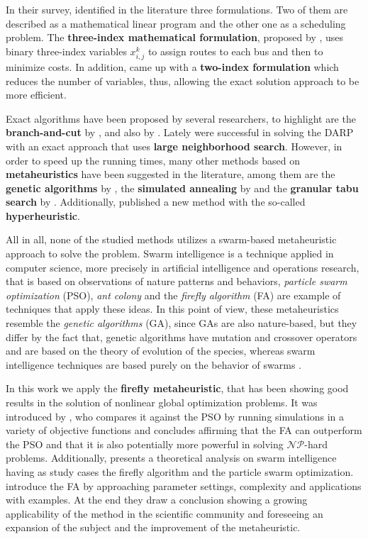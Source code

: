 \documentclass[tuberlin,cic,tc,openright,english,noabntcite,oneside]{iiufrgs}
\begin{document}
In their survey, \textcite{cordeau_dial--ride_2007} identified in the literature three formulations. Two of them are described as a mathematical linear program and the other one as a scheduling problem. The \textbf{three-index mathematical formulation}, proposed by \textcite{cordeau_branch-and-cut_2006}, uses binary three-index variables $x_{i,j}^{k}$ to assign routes to each bus and then to minimize costs. In addition, \textcite{ropke_models_2007} came up with a \textbf{two-index formulation} which reduces the number of variables, thus, allowing the exact solution approach to be more efficient.

Exact algorithms have been proposed by several researchers, to highlight are the \textbf{branch-and-cut} by \textcite{cordeau_branch-and-cut_2006}, and also by \textcite{ropke_models_2007}. Lately \textcite{parragh_hybrid_2013} were successful in solving the DARP with an exact approach that uses \textbf{large neighborhood search}. However, in order to speed up the running times, many other methods based on \textbf{metaheuristics} have been suggested in the literature, among them are the \textbf{genetic algorithms} by \textcite{jorgensen_solving_2007}, the \textbf{simulated annealing} by \textcite{zidi_multi-objective_2012} and the \textbf{granular tabu search} by \textcite{kirchler_granular_2013}. Additionally, \textcite{urra_hyperheuristic_2015} published a new method with the so-called \textbf{hyperheuristic}.

All in all, none of the studied methods utilizes a swarm-based metaheuristic approach to solve the problem. Swarm intelligence is a technique applied in computer science, more precisely in artificial intelligence and operations research, that is based on observations of nature patterns and behaviors, \emph{particle swarm optimization} (PSO), \emph{ant colony} and the \emph{firefly algorithm} (FA) are example of techniques that apply these ideas. In this point of view, these metaheuristics resemble the \emph{genetic algorithms} (GA), since GAs are also nature-based, but they differ by the fact that, genetic algorithms have mutation and crossover operators and are based on the theory of evolution of the species, whereas swarm intelligence techniques are based purely on the behavior of swarms \parencite[p. 189-190]{yang_efficiency_2012}.

In this work we apply the \textbf{firefly metaheuristic}, that has been showing good results in the solution of nonlinear global optimization problems. It was introduced by \textcite{yang_firefly_2009}, who compares it against the PSO by running simulations in a variety of objective functions and concludes affirming that the FA can outperform the PSO and that it is also potentially more powerful in solving $\mathcal{NP}$-hard problems. Additionally, \textcite{yang_efficiency_2012} presents a theoretical analysis on swarm intelligence having as study cases the firefly algorithm and the particle swarm optimization. \textcite{yang_firefly_2013} introduce the FA by approaching parameter settings, complexity and applications with examples. At the end they draw a conclusion showing a growing applicability of the method in the scientific community and foreseeing an expansion of the subject and the improvement of the metaheuristic.
\end{document}
